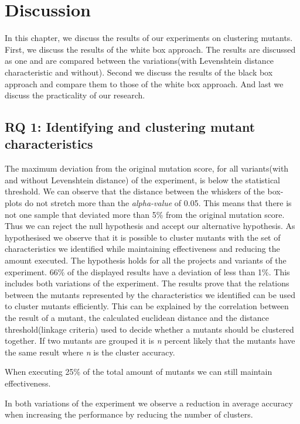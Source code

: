 \documentclass[../main]{subfiles}
\begin{document}
\chapter{Discussion}
\label{ch:discussion}
In this chapter, we discuss the results of our experiments on clustering mutants.
First, we discuss the results of the white box approach. 
The results are discussed as one and are compared between the variations(with Levenshtein distance characteristic and without).
Second we discuss the results of the black box approach and compare them to those of the white box approach.
And last we discuss the practicality of our research.

\section{RQ 1: Identifying and clustering mutant characteristics}
The maximum deviation from the original mutation score, for all variants(with and without Levenshtein distance) of the experiment, is below the statistical threshold.
We can observe that the distance between the whiskers of the box-plots do not stretch more than the \textit{alpha-value} of 0.05.
This means that there is not one sample that deviated more than 5\% from the original mutation score.
Thus we can reject the null hypothesis and accept our alternative hypothesis.
As hypothesised we observe that it is possible to cluster mutants with the set of characteristics we identified while maintaining effectiveness and reducing the amount executed.
The hypothesis holds for all the projects and variants of the experiment.
66\% of the displayed results have a deviation of less than 1\%. 
This includes both variations of the experiment.
\newline
The results prove that the relations between the mutants represented by the characteristics we identified can be used to cluster mutants efficiently. 
This can be explained by the correlation between the result of a mutant, the calculated euclidean distance and the distance threshold(linkage criteria) used to decide whether a mutants should be clustered together.
\newline
If two mutants are grouped it is \textit{n} percent likely that the mutants have the same result where \textit{n} is the cluster accuracy.
\begin{finding}
    When executing 25\% of the total amount of mutants we can still maintain effectiveness.
\end{finding}
In both variations of the experiment we observe a reduction in average accuracy when increasing the performance by reducing the number of clusters.
\end{document}
